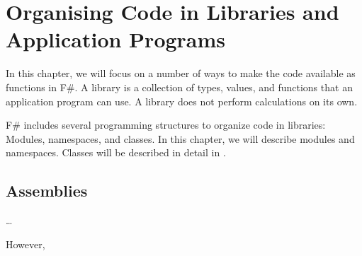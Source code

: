 \documentclass[fsharpNotes.tex]{subfiles}
\begin{document}
\chapter{Organising Code in Libraries and Application Programs}
\label{chap:modules}

In this chapter, we will focus on a number of ways to make the code available as  functions in F\#. A library is a collection of types, values, and functions that an application program can use. A library does not perform calculations on its own.

F\# includes several programming structures to organize code in libraries: Modules, namespaces, and classes. In this chapter, we will describe modules and namespaces. Classes will be described in detail in .


\section{Assemblies}
\label{chap:assemblies}

\dots

However,  
\end{document}
